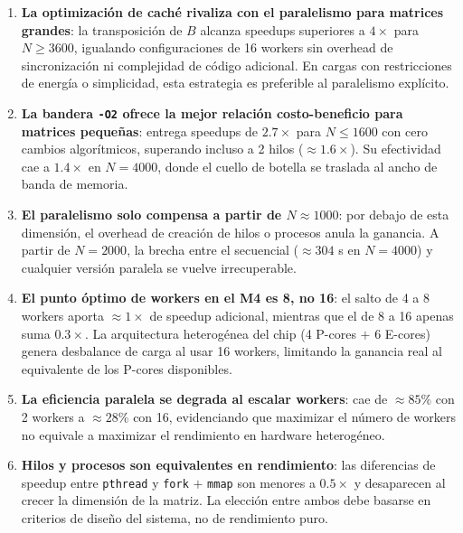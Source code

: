 \documentclass{article}
\begin{document}
\begin{enumerate}
    \item \textbf{La optimización de caché rivaliza con el paralelismo para matrices grandes}: 
    la transposición de $B$ alcanza speedups superiores a $4\times$ para $N \geq 3600$, 
    igualando configuraciones de 16 workers sin overhead de sincronización ni complejidad 
    de código adicional. En cargas con restricciones de energía o simplicidad, esta 
    estrategia es preferible al paralelismo explícito.

    \item \textbf{La bandera \texttt{-O2} ofrece la mejor relación costo-beneficio para 
    matrices pequeñas}: entrega speedups de $2.7\times$ para $N \leq 1600$ con cero 
    cambios algorítmicos, superando incluso a 2 hilos ($\approx 1.6\times$). Su efectividad 
    cae a $1.4\times$ en $N = 4000$, donde el cuello de botella se traslada al ancho de 
    banda de memoria.

    \item \textbf{El paralelismo solo compensa a partir de $N \approx 1000$}: por debajo 
    de esta dimensión, el overhead de creación de hilos o procesos anula la ganancia. A 
    partir de $N = 2000$, la brecha entre el secuencial ($\approx 304$ s en $N = 4000$) 
    y cualquier versión paralela se vuelve irrecuperable.

    \item \textbf{El punto óptimo de workers en el M4 es 8, no 16}: el salto de 4 a 8 
    workers aporta $\approx 1\times$ de speedup adicional, mientras que el de 8 a 16 apenas 
    suma $0.3\times$. La arquitectura heterogénea del chip (4 P-cores $+$ 6 E-cores) genera 
    desbalance de carga al usar 16 workers, limitando la ganancia real al equivalente de 
    los P-cores disponibles.

    \item \textbf{La eficiencia paralela se degrada al escalar workers}: cae de $\approx 85\%$ 
    con 2 workers a $\approx 28\%$ con 16, evidenciando que maximizar el número de workers 
    no equivale a maximizar el rendimiento en hardware heterogéneo.

    \item \textbf{Hilos y procesos son equivalentes en rendimiento}: las diferencias de 
    speedup entre \texttt{pthread} y \texttt{fork} $+$ \texttt{mmap} son menores a $0.5\times$ 
    y desaparecen al crecer la dimensión de la matriz. La elección entre ambos debe basarse 
    en criterios de diseño del sistema, no de rendimiento puro.
\end{enumerate}
\end{document}

